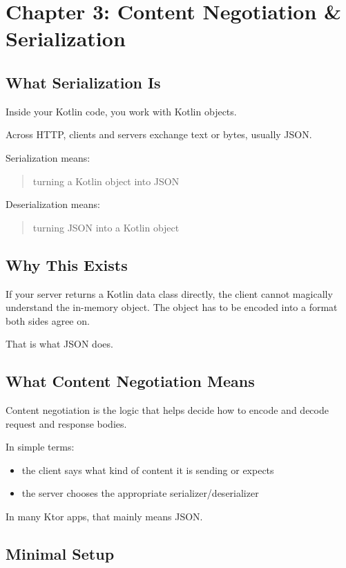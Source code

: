 \documentclass[11pt,a4paper]{article}
\begin{document}
\section{Chapter 3: Content Negotiation \& Serialization}

\subsection{What Serialization Is}

Inside your Kotlin code, you work with Kotlin objects.

Across HTTP, clients and servers exchange text or bytes, usually JSON.

Serialization means:
\begin{quote}
turning a Kotlin object into JSON
\end{quote}

Deserialization means:
\begin{quote}
turning JSON into a Kotlin object
\end{quote}

\subsection{Why This Exists}

If your server returns a Kotlin data class directly, the client cannot magically understand the in-memory object.
The object has to be encoded into a format both sides agree on.

That is what JSON does.

\subsection{What Content Negotiation Means}

Content negotiation is the logic that helps decide how to encode and decode request and response bodies.

In simple terms:
\begin{itemize}
    \item the client says what kind of content it is sending or expects
    \item the server chooses the appropriate serializer/deserializer
\end{itemize}

In many Ktor apps, that mainly means JSON.

\subsection{Minimal Setup}
\end{document}

